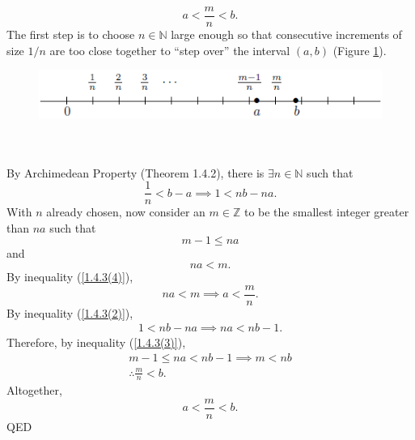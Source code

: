 \documentclass{article}
\begin{document}
        \begin{equation}
            a < \frac{m}{n} < b.
            \label{1.4.3(1)}
        \end{equation}
        The first step is to choose $n \in \mathbb{N}$ large enough so that consecutive increments of size $1/n$ are too close together to “step over” the interval $(a, b)$ (Figure \ref{theorem1.4.3}).
        \begin{figure}[ht!]
            \centering
            \includegraphics[width=0.8\linewidth]{figs/theorem1.4.3.png}
            \caption{}
            \label{theorem1.4.3}
        \end{figure}\\ \\
        By Archimedean Property (Theorem 1.4.2), there is $\exists n \in \mathbb{N}$ such that
        \begin{equation}
            \frac{1}{n} < b-a \implies 1 < nb - na.
            \label{1.4.3(2)}
        \end{equation}
        With $n$ already chosen, now consider an $m \in \mathbb{Z}$ to be the smallest integer greater than $na$ such that
        \begin{equation}
            m-1 \leq na
            \label{1.4.3(3)}
        \end{equation}
        and
        \begin{equation}
            na < m.
            \label{1.4.3(4)}
        \end{equation}
        By inequality (\ref{1.4.3(4)}),
        \begin{equation*}
            na < m \implies a < \frac{m}{n}.
        \end{equation*}
        By inequality (\ref{1.4.3(2)}),
        \begin{align*}
            1 < nb - na \implies na < nb -1.
        \end{align*}
        Therefore, by inequality (\ref{1.4.3(3)}),
        \begin{gather*}
            m-1 \leq na < nb-1 \implies m < nb \\
            \therefore \frac{m}{n} < b.
        \end{gather*}
        Altogether,
        \begin{equation*}
            a < \frac{m}{n} < b.
        \end{equation*}
        QED \\
        
\end{document}
